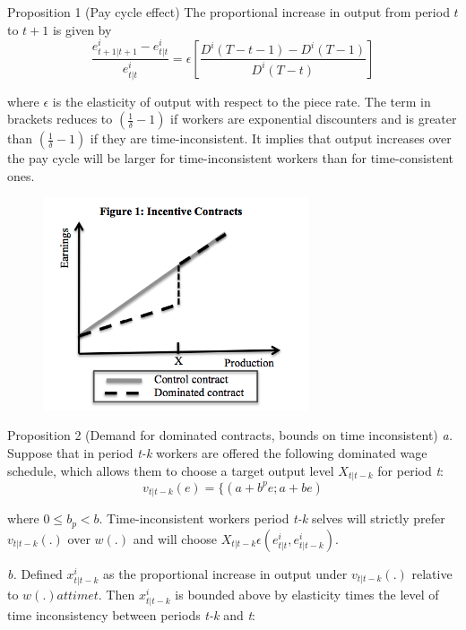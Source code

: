 \documentclass[a4paper,12pt]{article}
\begin{document}
Proposition 1 (Pay cycle effect) The proportional increase in output from period $t$ to $t+1$ is given by 
\begin{equation}
 \frac{e_{t+1 \vert t+1}^i-e_{t \vert t}^i}{e_{t \vert t}^i}=\epsilon \left[ \frac{D^i (T-t-1)-D^i(T-1)}{D^i(T-t)}\right]
\end{equation}

where $\epsilon$ is the elasticity of output with respect to the piece rate. The term in brackets reduces to $(\frac{1}{\delta}-1)$ if workers are exponential discounters and is greater than $(\frac{1}{\delta}-1)$ if they are time-inconsistent. It implies that output increases over the pay cycle will be larger for time-inconsistent workers than for time-consistent ones. 
\begin{figure}[h]
\centering
\includegraphics[width=0.7\textwidth]{Figure1_1.png}
\caption{\label{fig:Figure1}}
\end{figure}

Proposition 2 (Demand for dominated contracts, bounds on time inconsistent)
\textit{a.} Suppose that in period \textit{t-k} workers are offered the following dominated wage schedule, which allows them to choose a target output level $X_{t|t-k}$ for period \textit{t}: 
\begin{equation}
v_{t|t-k}(e)=\{(a+b^pe ; a+be  ) 
\end{equation}

where $0\leq b_p<b$. Time-inconsistent workers period \textit{t-k} selves will strictly prefer $v_{t|t-k}(.)$ over $w(.)$ and will choose $X_{t|t-k}\epsilon(e^i_{t|t}, e^i_{t|t-k})$. 

\textit{b.} Defined $x^i_{t|t-k}$ as the proportional increase in output under $v_{t|t-k}(.)$ relative to $w(.) at time \textit{t}$. Then $x^i_{t|t-k}$  is bounded above by elasticity times the level of time inconsistency between periods \textit{t-k} and \textit{t}: 
\end{document}
